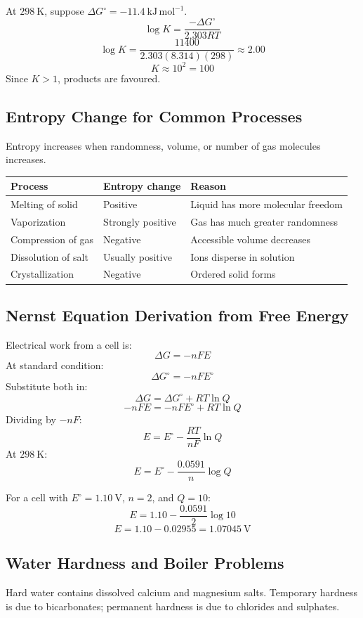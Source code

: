 \documentclass[12pt,a4paper]{article}
\begin{document}
\begin{tcolorbox}[examplebox, title={Solved Example: Equilibrium Constant from Free Energy}]
At $298\ \mathrm{K}$, suppose $\Delta G^\circ=-11.4\ \mathrm{kJ\,mol^{-1}}$.
\[
\log K=\frac{-\Delta G^\circ}{2.303RT}
\]
\[
\log K=\frac{11400}{2.303(8.314)(298)}\approx2.00
\]
\[
K\approx10^2=100
\]
Since $K>1$, products are favoured.
\end{tcolorbox}

\subsection{Entropy Change for Common Processes}
Entropy increases when randomness, volume, or number of gas molecules increases.

\begin{tabularx}{\linewidth}{|B{3.5cm}|Y|Y|}
\hline
\textbf{Process} & \textbf{Entropy change} & \textbf{Reason} \\
\hline
Melting of solid & Positive & Liquid has more molecular freedom \\
\hline
Vaporization & Strongly positive & Gas has much greater randomness \\
\hline
Compression of gas & Negative & Accessible volume decreases \\
\hline
Dissolution of salt & Usually positive & Ions disperse in solution \\
\hline
Crystallization & Negative & Ordered solid forms \\
\hline
\end{tabularx}

\subsection{Nernst Equation Derivation from Free Energy}
Electrical work from a cell is:
\[
\Delta G=-nFE
\]
At standard condition:
\[
\Delta G^\circ=-nFE^\circ
\]
Substitute both in:
\[
\Delta G=\Delta G^\circ+RT\ln Q
\]
\[
-nFE=-nFE^\circ+RT\ln Q
\]
Dividing by $-nF$:
\[
E=E^\circ-\frac{RT}{nF}\ln Q
\]
At $298\ \mathrm{K}$:
\[
E=E^\circ-\frac{0.0591}{n}\log Q
\]

\begin{tcolorbox}[examplebox, title={Solved Example: Cell Potential}]
For a cell with $E^\circ=1.10\ \mathrm{V}$, $n=2$, and $Q=10$:
\[
E=1.10-\frac{0.0591}{2}\log 10
\]
\[
E=1.10-0.02955=1.07045\ \mathrm{V}
\]
\end{tcolorbox}

\subsection{Water Hardness and Boiler Problems}
Hard water contains dissolved calcium and magnesium salts. Temporary hardness is due to bicarbonates; permanent hardness is due to chlorides and sulphates.
\end{document}

